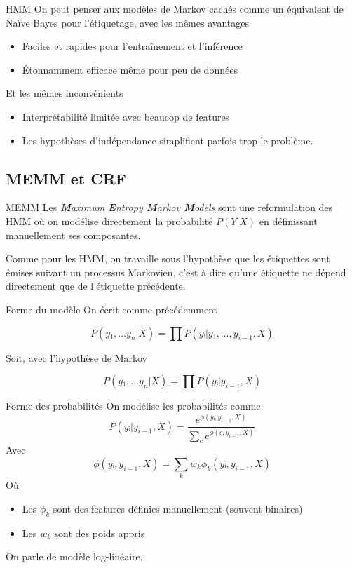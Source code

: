\documentclass[../allslides.tex]{subfiles}
\begin{document}
\begin{frame}{HMM}
	On peut penser aux modèles de Markov cachés comme un équivalent de Naïve Bayes pour l'étiquetage, avec les mêmes avantages
	\begin{itemize}
		\item Faciles et rapides pour l'entraînement et l'inférence
		\item Étonnamment efficace même pour peu de données
	\end{itemize}
	Et les mêmes inconvénients
	\begin{itemize}
		\item Interprétabilité limitée avec beaucop de features
		\item Les hypothèses d'indépendance simplifient parfois trop le problème.
	\end{itemize}
\end{frame}

\subsection{MEMM et CRF}
\begin{frame}{MEMM}
	Les \alert{\textit{\textbf{M}aximum \textbf{E}ntropy \textbf{M}arkov \textbf{M}odels}} sont une reformulation des HMM où on modélise directement la probabilité $P(Y|X)$ en définissant manuellement ses composantes.

	Comme pour les HMM, on travaille sous l'hypothèse que les étiquettes sont émises suivant un processus Markovien, c'est à dire qu'une étiquette ne dépend directement que de l'étiquette précédente.
\end{frame}

\begin{frame}{Forme du modèle}
	On écrit comme précédemment

	\begin{equation}
		P(y₁,…y_n|X) = ∏P(yᵢ|y₁,…, y_{i-1}, X)
	\end{equation}

	Soit, avec l'hypothèse de \alert{Markov}

	\begin{equation}
		P(y₁,…y_n|X) = ∏P(yᵢ|y_{i-1}, X)
	\end{equation}
\end{frame}

\begin{frame}{Forme des probabilités}
	On modélise les probabilités comme
	\begin{equation}
		P(yᵢ|y_{i-1}, X) = \frac{e^{ϕ(yᵢ, y_{i-1}, X)}}{∑_c e^{ϕ(c, y_{i-1}, X)}}
	\end{equation}
	Avec
	\begin{equation}
		ϕ(yᵢ, y_{i-1}, X) = \sum_k w_k  ϕ_k(yᵢ, y_{i-1}, X)
	\end{equation}
	Où
	\begin{itemize}
		\item Les $ϕ_k$ sont des features définies manuellement (souvent binaires)
		\item Les $w_k$ sont des poids appris
	\end{itemize}

	On parle de modèle \alert{log-linéaire}.
\end{frame}
\end{document}
